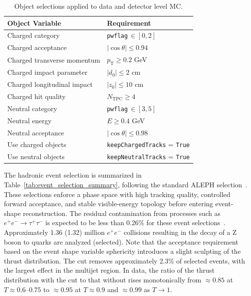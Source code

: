 \begin{table}[ht!]
\centering
\begin{tabular}{@{}p{}p{}@{}}
\hline
Object Variable & Requirement \\
\hline
Charged category & \texttt{pwflag}\,$\in[0,2]$ \\
Charged acceptance & $|\cos\theta|\le 0.94$ \\
Charged transverse momentum & $p_{\mathrm{T}}\ge 0.2$ GeV \\
Charged impact parameter & $|d_0|\le 2$ cm \\
Charged longitudinal impact & $|z_0|\le 10$ cm \\
Charged hit quality & $N_{\mathrm{TPC}}\ge 4$ \\
Neutral category & \texttt{pwflag}\,$\in[3,5]$ \\
Neutral energy & $E\ge 0.4$ GeV \\
Neutral acceptance & $|\cos\theta|\le 0.98$ \\
Use charged objects & \texttt{keepChargedTracks} = \texttt{True} \\
Use neutral objects & \texttt{keepNeutralTracks} = \texttt{True} \\
\hline
\end{tabular}
\caption{Object selections applied to data and detector level MC.}
\label{tab:particle_selection_summary}
\end{table}

The hadronic event selection is summarized in Table~\ref{tab:event_selection_summary}, following the standard ALEPH selection~\cite{Heister:2003aj, Barate:1996fi}. These selections enforce a phase space with high tracking quality, controlled forward acceptance, and stable visible-energy topology before entering event-shape reconstruction. The residual contamination from processes such as $e^+e^- \rightarrow \tau^+\tau^-$ is expected to be less than 0.26\% for these event selections~\cite{Barate:1996fi}. Approximately 1.36 (1.32) million $e^+e^-$ collisions resulting in the decay of a Z boson to quarks are analyzed (selected). Note that the acceptance requirement based on the event shape variable sphericity introduces a slight sculpting of the thrust distribution. The cut removes approximately 2.3\% of selected events, with the largest effect in the multijet region. In data, the ratio of the thrust distribution with the cut to that without rises monotonically from $\approx 0.85$ at $T \approx 0.6$--$0.75$ to $\approx 0.95$ at $T \approx 0.9$ and $\approx 0.99$ as $T \to 1$.

